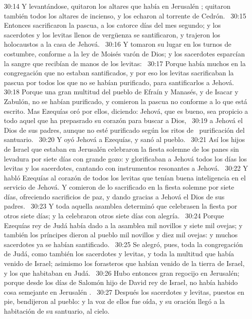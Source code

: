 																														30:14 Y levantándose, quitaron los altares que había en Jerusalén ; quitaron también todos los altares de incienso, y los echaron al torrente de Cedrón.  
																														30:15 Entonces sacrificaron la pascua, a los catorce días del mes segundo; y los sacerdotes y los levitas llenos de vergüenza se santificaron, y trajeron los holocaustos a la casa de Jehová.  
																														30:16 Y tomaron su lugar en los turnos de costumbre, conforme a la ley de Moisés varón de Dios; y los sacerdotes esparcían la sangre que recibían de manos de los levitas:  
																														30:17 Porque había muchos en la congregación que no estaban santificados, y por eso los levitas sacrificaban la pascua por todos los que no se habían purificado, para santificarlos a Jehová.  
																														30:18 Porque una gran multitud del pueblo de Efraín y Manasés, y de Isacar y Zabulón, no se habían purificado, y comieron la pascua no conforme a lo que está escrito. Mas Ezequías oró por ellos, diciendo: Jehová, que es bueno, sea propicio a todo aquel que ha prepasrado su corazón para buscar a Dios,  
																														30:19 a Jehová el Dios de sus padres, aunque no esté purificado según los ritos de  purificación del santuario.  
																														30:20 Y oyó Jehová a Ezequías, y sanó al pueblo.  
																														30:21 Así los hijos de Israel que estaban en Jerusalén celebraron la fiesta solemne de los panes sin levadura por siete días con grande gozo: y glorificaban a Jehová todos los días los levitas y los sacerdotes, cantando con instrumentos resonantes a Jehová.  
																														30:22 Y habló Ezequías al corazón de todos los levitas que tenían buena inteligencia en el servicio de Jehová. Y comieron de lo sacrificado en la fiesta solemne por siete días, ofreciendo sacrificios de paz, y dando gracias a Jehová el Dios de sus padres.  
																														30:23 Y toda aquella asamblea determinó que celebrasen la fiesta por otros siete días; y la celebraron otros siete días con alegría.  
																														30:24 Porque Ezequías rey de Judá había dado a la asamblea mil novillos y siete mil ovejas; y también los príncipes dieron al pueblo mil novillos y diez mil ovejas: y muchos sacerdotes ya se habían santificado.  
																														30:25 Se alegró, pues, toda la congregación de Judá, como también los sacerdotes y levitas, y toda la multitud que había venido de Israel; asimismo los forasteros que habían venido de la tierra de Israel, y los que habitaban en Judá.  
																														30:26 Hubo entonces gran regocijo en Jerusalén; porque desde los días de Salomón hijo de David rey de Israel, no había habido cosa semejante en Jerusalén .  
																														30:27 Después los sacerdotes y levitas, puestos en pie, bendijeron al pueblo: y la voz de ellos fue oída, y su oración llegó a la habitación de su santuario, al cielo.  
